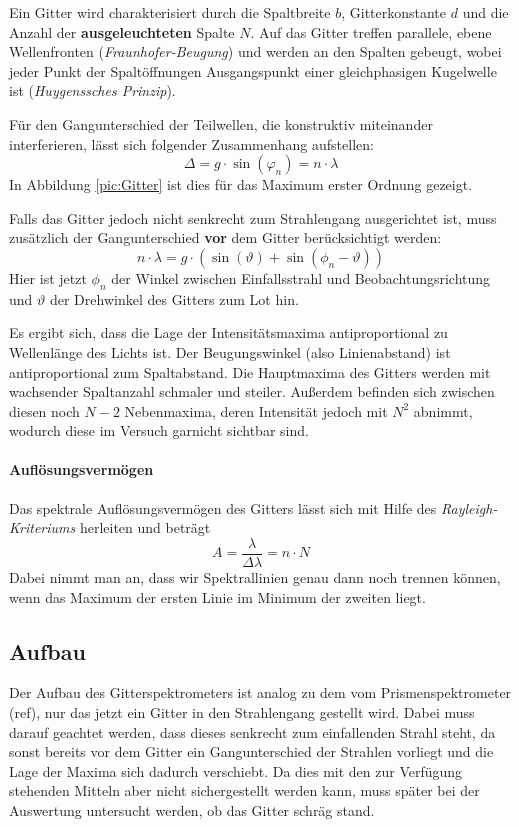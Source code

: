 \documentclass[a4paper, 11pt]{article}
\begin{document}
Ein Gitter wird charakterisiert durch die Spaltbreite $b$, Gitterkonstante $d$ und die Anzahl der \textbf{ausgeleuchteten} Spalte $N$. Auf das Gitter treffen parallele, ebene Wellenfronten (\textit{Fraunhofer-Beugung}) und werden an den Spalten gebeugt, wobei jeder Punkt der Spaltöffnungen Ausgangspunkt einer gleichphasigen Kugelwelle ist (\textit{Huygenssches Prinzip}).

Für den Gangunterschied  der Teilwellen, die konstruktiv miteinander interferieren, lässt sich folgender Zusammenhang aufstellen:
\begin{equation}
	\Delta = g \cdot \sin(\varphi_n) = n \cdot \lambda
\end{equation}
In Abbildung \ref{pic:Gitter} ist dies für das Maximum erster Ordnung gezeigt.

Falls das Gitter jedoch nicht senkrecht zum Strahlengang ausgerichtet ist, muss zusätzlich der Gangunterschied \textbf{vor} dem Gitter berücksichtigt werden:
\begin{equation}
	n \cdot \lambda = g \cdot (\sin(\vartheta)+\sin(\phi_n-\vartheta))
\end{equation}
Hier ist jetzt $\phi_n$ der Winkel zwischen Einfallsstrahl und Beobachtungsrichtung und $\vartheta$ der Drehwinkel des Gitters zum Lot hin.

Es ergibt sich, dass die Lage der Intensitätsmaxima antiproportional zu Wellenlänge des Lichts ist. Der Beugungswinkel (also Linienabstand) ist antiproportional zum Spaltabstand.
Die Hauptmaxima des Gitters werden mit wachsender Spaltanzahl schmaler und steiler. Außerdem befinden sich zwischen diesen noch $N-2$ Nebenmaxima, deren Intensität jedoch mit $N^2$ abnimmt, wodurch diese im Versuch garnicht sichtbar sind.


\clearpage
\paragraph{Auflösungsvermögen}
Das spektrale Auflösungsvermögen des Gitters lässt sich mit Hilfe des \textit{Rayleigh-Kriteriums} herleiten und beträgt
\begin{equation}\label{eq:AGitter}
	A = \frac{\lambda}{\Delta\lambda} = n \cdot N
\end{equation}
Dabei nimmt man an, dass wir Spektrallinien genau dann noch trennen können, wenn das Maximum der ersten Linie im Minimum der zweiten liegt.




\subsection{Aufbau}
Der Aufbau des Gitterspektrometers ist analog zu dem vom Prismenspektrometer (ref), nur das jetzt ein Gitter in den Strahlengang gestellt wird. Dabei muss darauf geachtet werden, dass dieses senkrecht zum einfallenden Strahl steht, da sonst bereits vor dem Gitter ein Gangunterschied der Strahlen vorliegt und die Lage der Maxima sich dadurch verschiebt. Da dies mit den zur Verfügung stehenden Mitteln aber nicht sichergestellt werden kann, muss später bei der Auswertung untersucht werden, ob das Gitter schräg stand.
\end{document}
